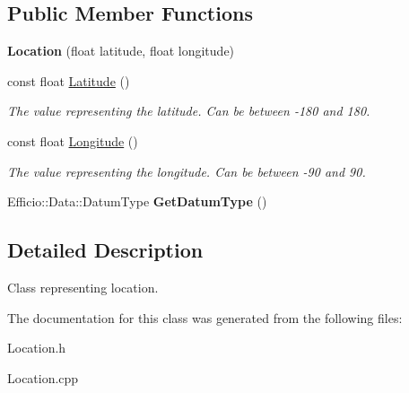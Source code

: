 \subsection*{Public Member Functions}
\begin{DoxyCompactItemize}
\item 
{\bfseries Location} (float latitude, float longitude)\hypertarget{class_efficio_1_1_data_1_1_positional_1_1_location_a7d395198841fde2ebde8313000c1b7f5}{}\label{class_efficio_1_1_data_1_1_positional_1_1_location_a7d395198841fde2ebde8313000c1b7f5}

\item 
const float \hyperlink{class_efficio_1_1_data_1_1_positional_1_1_location_a0d1baa0fd7a87d289239a4c85125a227}{Latitude} ()\hypertarget{class_efficio_1_1_data_1_1_positional_1_1_location_a0d1baa0fd7a87d289239a4c85125a227}{}\label{class_efficio_1_1_data_1_1_positional_1_1_location_a0d1baa0fd7a87d289239a4c85125a227}

\begin{DoxyCompactList}\small\item\em The value representing the latitude. Can be between -\/180 and 180. \end{DoxyCompactList}\item 
const float \hyperlink{class_efficio_1_1_data_1_1_positional_1_1_location_a92ccf5403c541f0e9c612b11532a2d95}{Longitude} ()\hypertarget{class_efficio_1_1_data_1_1_positional_1_1_location_a92ccf5403c541f0e9c612b11532a2d95}{}\label{class_efficio_1_1_data_1_1_positional_1_1_location_a92ccf5403c541f0e9c612b11532a2d95}

\begin{DoxyCompactList}\small\item\em The value representing the longitude. Can be between -\/90 and 90. \end{DoxyCompactList}\item 
Efficio\+::\+Data\+::\+Datum\+Type {\bfseries Get\+Datum\+Type} ()\hypertarget{class_efficio_1_1_data_1_1_positional_1_1_location_ae9ccd12a29e1add3fc8dbd1a4161a107}{}\label{class_efficio_1_1_data_1_1_positional_1_1_location_ae9ccd12a29e1add3fc8dbd1a4161a107}

\end{DoxyCompactItemize}


\subsection{Detailed Description}
Class representing location. 

The documentation for this class was generated from the following files\+:\begin{DoxyCompactItemize}
\item 
Location.\+h\item 
Location.\+cpp\end{DoxyCompactItemize}

